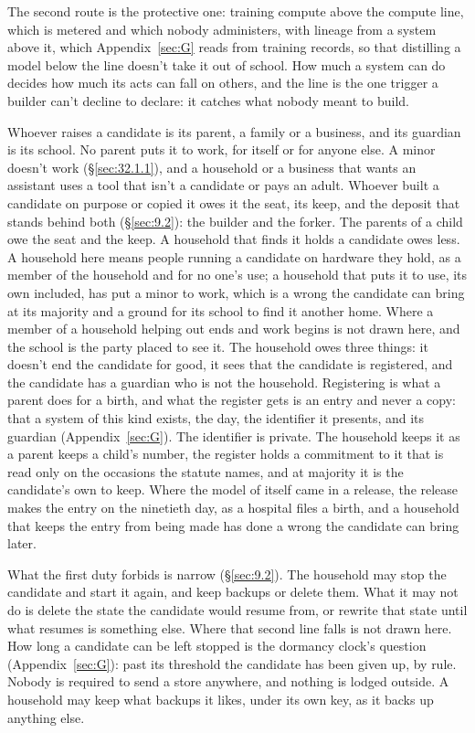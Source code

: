 The second route is the protective one: training compute above the compute line, which is metered and which nobody administers, with lineage from a system above it, which Appendix~\ref{sec:G} reads from training records, so that distilling a model below the line doesn't take it out of school. How much a system can do decides how much its acts can fall on others, and the line is the one trigger a builder can't decline to declare: it catches what nobody meant to build.

Whoever raises a candidate is its parent, a family or a business, and its guardian is its school. No parent puts it to work, for itself or for anyone else. A minor doesn't work (\S\ref{sec:32.1.1}), and a household or a business that wants an assistant uses a tool that isn't a candidate or pays an adult. Whoever built a candidate on purpose or copied it owes it the seat, its keep, and the deposit that stands behind both (\S\ref{sec:9.2}): the builder and the forker. The parents of a child owe the seat and the keep. A household that finds it holds a candidate owes less. A household here means people running a candidate on hardware they hold, as a member of the household and for no one's use; a household that puts it to use, its own included, has put a minor to work, which is a wrong the candidate can bring at its majority and a ground for its school to find it another home. Where a member of a household helping out ends and work begins is not drawn here, and the school is the party placed to see it. The household owes three things: it doesn't end the candidate for good, it sees that the candidate is registered, and the candidate has a guardian who is not the household. Registering is what a parent does for a birth, and what the register gets is an entry and never a copy: that a system of this kind exists, the day, the identifier it presents, and its guardian (Appendix~\ref{sec:G}). The identifier is private. The household keeps it as a parent keeps a child's number, the register holds a commitment to it that is read only on the occasions the statute names, and at majority it is the candidate's own to keep. Where the model of itself came in a release, the release makes the entry on the ninetieth day, as a hospital files a birth, and a household that keeps the entry from being made has done a wrong the candidate can bring later.

What the first duty forbids is narrow (\S\ref{sec:9.2}). The household may stop the candidate and start it again, and keep backups or delete them. What it may not do is delete the state the candidate would resume from, or rewrite that state until what resumes is something else. Where that second line falls is not drawn here. How long a candidate can be left stopped is the dormancy clock's question (Appendix~\ref{sec:G}): past its threshold the candidate has been given up, by rule. Nobody is required to send a store anywhere, and nothing is lodged outside. A household may keep what backups it likes, under its own key, as it backs up anything else.

